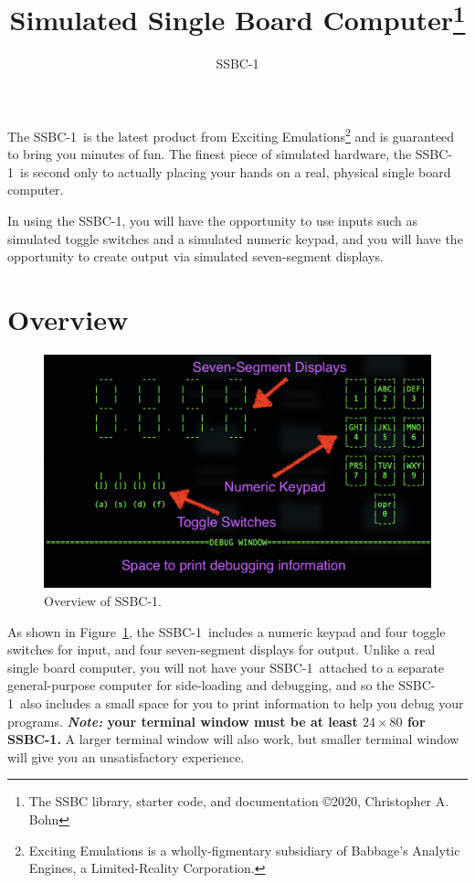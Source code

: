 \documentclass[12pt]{article}
\newcommand{\SSBC}{SSBC-1}
\begin{document}
\title{Simulated Single Board Computer\footnote{The SSBC library, starter code, and documentation \copyright 2020, Christopher A. Bohn}}
\author{\SSBC}
\date{}
\maketitle

The \SSBC\ is the latest product from Exciting Emulations\footnote{Exciting
Emulations is a wholly-figmentary subsidiary of Babbage's Analytic Engines, a
Limited-Reality Corporation.} and is guaranteed to bring you minutes of fun.
The finest piece of simulated hardware, the \SSBC\ is second only to actually
placing your hands on a real, physical single board computer.

In using the \SSBC, you will have the opportunity to use inputs such as
simulated toggle switches and a simulated numeric keypad, and you will have the
opportunity to create output via simulated seven-segment displays.

\section{Overview}

\begin{figure}
    \centering
    \includegraphics[width=15cm]{overview}
    \caption{Overview of \SSBC.\label{fig:overview}}
\end{figure}

As shown in Figure~\ref{fig:overview}, the \SSBC\ includes a numeric keypad and
four toggle switches for input, and four seven-segment displays for output.
Unlike a real single board computer, you will not have your \SSBC\ attached to a
separate general-purpose computer for side-loading and debugging, and so the
\SSBC\ also includes a small space for you to print information to help you
debug your programs. \textbf{\textit{Note:} your terminal window must be at
least $24 \times 80$ for \SSBC.} A larger terminal window will also work, but
smaller terminal window will give you an unsatisfactory experience.
\end{document}
